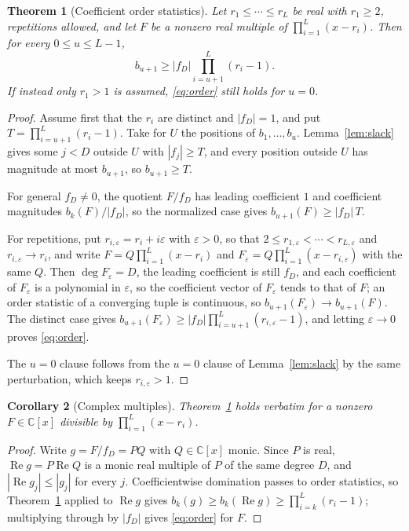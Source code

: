 \documentclass[11pt]{article}
\newtheorem{theorem}{Theorem}[section]
\newtheorem{corollary}[theorem]{Corollary}
\begin{document}
\begin{theorem}[Coefficient order statistics]\label{thm:order}
Let $r_1\le\cdots\le r_L$ be real with $r_1\ge2$, repetitions allowed, and
let $F$ be a nonzero real multiple of $\prod_{i=1}^L(x-r_i)$.  Then for every
$0\le u\le L-1$,
\begin{equation}\label{eq:order}
  b_{u+1}\ge|f_D|\prod_{i=u+1}^L(r_i-1).
\end{equation}
If instead only $r_1>1$ is assumed, \eqref{eq:order} still holds for $u=0$.
\end{theorem}

\begin{proof}
Assume first that the $r_i$ are distinct and $|f_D|=1$, and put
$T=\prod_{i=u+1}^L(r_i-1)$.  Take for $U$ the positions of $b_1,\ldots,b_u$.
Lemma~\ref{lem:slack} gives some $j<D$ outside $U$ with $|f_j|\ge T$, and
every position outside $U$ has magnitude at most $b_{u+1}$, so
$b_{u+1}\ge T$.

For general $f_D\ne0$, the quotient $F/f_D$ has leading coefficient $1$ and
coefficient magnitudes $b_k(F)/|f_D|$, so the normalized case gives
$b_{u+1}(F)\ge|f_D|\,T$.

For repetitions, put $r_{i,\varepsilon}=r_i+i\varepsilon$ with
$\varepsilon>0$, so that $2\le r_{1,\varepsilon}<\cdots<r_{L,\varepsilon}$ and
$r_{i,\varepsilon}\to r_i$, and write $F=Q\prod_{i=1}^L(x-r_i)$ and
$F_\varepsilon=Q\prod_{i=1}^L(x-r_{i,\varepsilon})$ with the same $Q$.  Then
$\deg F_\varepsilon=D$, the leading coefficient is still $f_D$, and each
coefficient of $F_\varepsilon$ is a polynomial in $\varepsilon$, so the
coefficient vector of $F_\varepsilon$ tends to that of $F$; an order statistic of a converging tuple is continuous, so
$b_{u+1}(F_\varepsilon)\to b_{u+1}(F)$.  The distinct case gives
$b_{u+1}(F_\varepsilon)\ge|f_D|\prod_{i=u+1}^L(r_{i,\varepsilon}-1)$, and letting
$\varepsilon\to0$ proves \eqref{eq:order}.

The $u=0$ clause follows from the $u=0$ clause of Lemma~\ref{lem:slack} by
the same perturbation, which keeps $r_{i,\varepsilon}>1$.
\end{proof}

\begin{corollary}[Complex multiples]\label{cor:complex}
Theorem~\ref{thm:order} holds verbatim for a nonzero $F\in\mathbb C[x]$
divisible by $\prod_{i=1}^L(x-r_i)$.
\end{corollary}

\begin{proof}
Write $g=F/f_D=PQ$ with $Q\in\mathbb C[x]$ monic.  Since $P$ is real,
$\operatorname{Re}g=P\operatorname{Re}Q$ is a monic real multiple of $P$ of
the same degree $D$, and $|\operatorname{Re}g_j|\le|g_j|$ for every $j$.
Coefficientwise domination passes to order statistics, so
Theorem~\ref{thm:order} applied to $\operatorname{Re}g$ gives
$b_k(g)\ge b_k(\operatorname{Re}g)\ge\prod_{i=k}^L(r_i-1)$; multiplying
through by $|f_D|$ gives \eqref{eq:order} for $F$.
\end{proof}
\end{document}
